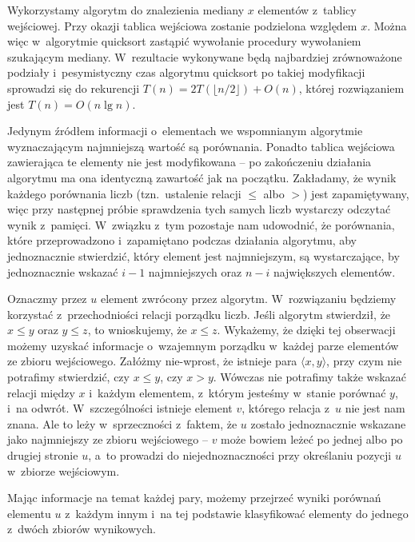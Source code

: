 \exercise %

\noindent Wykorzystamy algorytm  do znalezienia mediany $x$ elementów z~tablicy wejściowej. Przy okazji tablica wejściowa zostanie podzielona względem $x$. Można więc w~algorytmie quicksort zastąpić wywołanie procedury  wywołaniem  szukającym mediany. W~rezultacie wykonywane będą najbardziej zrównoważone podziały i~pesymistyczny czas algorytmu quicksort po takiej modyfikacji sprowadzi się do rekurencji $T(n)=2T(\lfloor n/2\rfloor)+O(n)$, której rozwiązaniem jest $T(n)=O(n\lg n)$.

\exercise %
Jedynym źródłem informacji o~elementach we wspomnianym algorytmie wyznaczającym  najmniejszą wartość są porównania. Ponadto tablica wejściowa zawierająca te elementy nie jest modyfikowana -- po zakończeniu działania algorytmu ma ona identyczną zawartość jak na początku. Zakładamy, że wynik każdego porównania liczb (tzn.\ ustalenie relacji $\le$ albo $>$) jest zapamiętywany, więc przy następnej próbie sprawdzenia tych samych liczb wystarczy odczytać wynik z~pamięci. W~związku z~tym pozostaje nam udowodnić, że porównania, które przeprowadzono i~zapamiętano podczas działania algorytmu, aby jednoznacznie stwierdzić, który element jest  najmniejszym, są wystarczające, by jednoznacznie wskazać $i-1$ najmniejszych oraz $n-i$ największych elementów.

Oznaczmy przez $u$ element zwrócony przez algorytm. W~rozwiązaniu będziemy korzystać z~przechodniości relacji porządku liczb. Jeśli algorytm stwierdził, że $x\le y$ oraz $y\le z$, to wnioskujemy, że $x\le z$. Wykażemy, że dzięki tej obserwacji możemy uzyskać informacje o~wzajemnym porządku w~każdej parze elementów ze zbioru wejściowego. Załóżmy nie-wprost, że istnieje para $\langle x,y\rangle$, przy czym nie potrafimy stwierdzić, czy $x\le y$, czy $x>y$. Wówczas nie potrafimy także wskazać relacji między $x$ i~każdym elementem, z~którym jesteśmy w~stanie porównać $y$, i~na odwrót. W~szczególności istnieje element $v$, którego relacja z~$u$ nie jest nam znana. Ale to leży w~sprzeczności z~faktem, że $u$ zostało jednoznacznie wskazane jako  najmniejszy ze zbioru wejściowego -- $v$ może bowiem leżeć po jednej albo po drugiej stronie $u$, a~to prowadzi do niejednoznaczności przy określaniu pozycji $u$ w~zbiorze wejściowym.

Mając informacje na temat każdej pary, możemy przejrzeć wyniki porównań elementu $u$ z~każdym innym i~na tej podstawie klasyfikować elementy do jednego z~dwóch zbiorów wynikowych.

